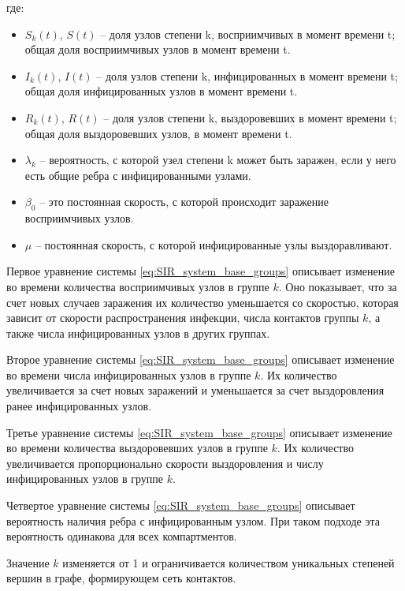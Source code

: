 \documentclass[14pt,a4paper]{article}
\begin{document}
где:
\begin{itemize}
	
	\item $S_k(t)$, $S(t)$ -- доля узлов степени k, восприимчивых в момент времени t; общая доля восприимчивых узлов в момент времени t.
	\item$I_k(t)$, $I(t)$ -- доля узлов степени k, инфицированных в момент времени t; общая доля инфицированных узлов	в момент времени t.
	\item $R_k(t)$, $R(t)$ -- доля узлов степени k, выздоровевших в момент времени t; общая доля выздоровевших узлов, в момент времени t.
	\item $\lambda_k$ -- вероятность, с которой узел степени k может быть заражен, если у него есть общие ребра с инфицированными узлами.
	\item $\beta_0$ -- это постоянная скорость, с которой происходит заражение восприимчивых узлов.
	\item $\mu$ -- постоянная скорость, с которой инфицированные узлы выздоравливают.

\end{itemize}

Первое уравнение системы \eqref{eq:SIR_system_base_groups} описывает изменение во времени количества восприимчивых узлов в группе $k$. Оно показывает, что  за счет новых случаев заражения их количество уменьшается со скоростью, которая зависит от скорости распространения инфекции, числа контактов группы $k$, а также числа инфицированных узлов в других группах.

Второе уравнение системы \eqref{eq:SIR_system_base_groups} описывает изменение во времени числа инфицированных узлов в группе $k$. Их количество  увеличивается за счет новых заражений и уменьшается за счет выздоровления ранее инфицированных узлов.
 
Третье уравнение системы \eqref{eq:SIR_system_base_groups} описывает изменение во времени количества выздоровевших узлов в группе $k$. Их количество  увеличивается пропорционально скорости выздоровления и числу инфицированных узлов в группе $k$.

Четвертое уравнение системы \eqref{eq:SIR_system_base_groups} описывает вероятность наличия ребра с инфицированным узлом. При таком подходе эта вероятность одинакова для всех компартментов.

Значение $k$ изменяется от 1 и ограничивается количеством уникальных степеней вершин в графе, формирующем сеть контактов.

\newpage
\end{document}
